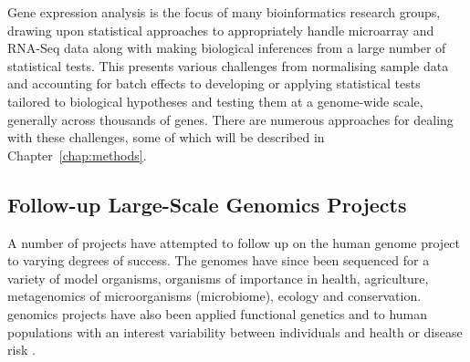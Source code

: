 Gene expression analysis is the focus of many \gls{bioinformatics} research groups, drawing upon statistical approaches to appropriately handle microarray and \gls{RNA-Seq} data along with making biological inferences from a large number of statistical tests. This presents various challenges from normalising sample data and accounting for batch effects to developing or applying statistical tests tailored to biological hypotheses and testing them at a genome-wide scale, generally across thousands of genes. There are numerous approaches for dealing with these challenges, some of which will be described in Chapter~\ref{chap:methods}.


\subsection{Follow-up Large-Scale Genomics Projects}
A number of projects have attempted to follow up on the human genome project to varying degrees of success. The genomes have since been sequenced for a variety of model organisms, organisms of importance in health, agriculture, \gls{metagenomics} of microorganisms (microbiome), ecology and conservation. \Gls{genomics} projects have also been applied functional genetics \citep{ENCODE2004, FANTOM2001} and to human populations with an interest variability between individuals and health or disease risk \citep{HapMap2003, 1000Genomes2010}.



